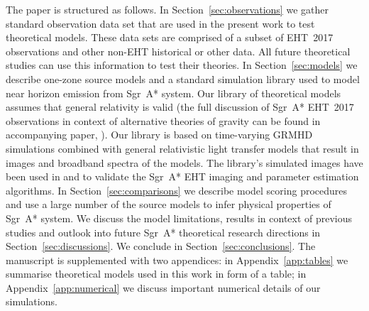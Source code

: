 The paper is structured as follows. In Section~\ref{sec:observations} we gather standard observation data set that are used in the present work to test theoretical models. These data sets are comprised of a subset of EHT~2017 observations and other non-EHT historical or other data. All future theoretical studies can use this information to test their theories. In Section~\ref{sec:models} we describe one-zone source models and a standard simulation library used to model near horizon emission from Sgr~A* system. Our library of theoretical models assumes that general relativity is valid (the full discussion of Sgr~A* EHT~2017 observations in context of alternative theories of gravity can be found in accompanying paper, ).
Our library is based on time-varying GRMHD simulations combined with general relativistic light transfer models that result in images and broadband spectra of the models. The library's simulated images have been used in  and  to validate the Sgr~A* EHT imaging and parameter estimation algorithms.
In Section~\ref{sec:comparisons} we describe model scoring procedures and use a large number of the source models to infer physical properties of Sgr~A* system. We discuss the model limitations, results in context of previous studies and outlook into future Sgr~A* theoretical research directions in Section~\ref{sec:discussions}. We conclude in Section~\ref{sec:conclusions}.
The manuscript is supplemented with two appendices: in Appendix~\ref{app:tables} we summarise theoretical models used in this work in form of a table; in Appendix~\ref{app:numerical} we discuss important numerical details of our simulations.



